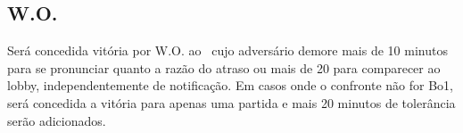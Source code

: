 \subsection{W.O.}

Será concedida vitória por W.O. ao \BasicUnit\ cujo adversário demore mais de 10 minutos para se pronunciar quanto a razão do atraso ou mais de 20 para comparecer ao lobby, independentemente de notificação. Em casos onde o confronte não for Bo1, será concedida a vitória para apenas uma partida e mais 20 minutos de tolerância serão adicionados.